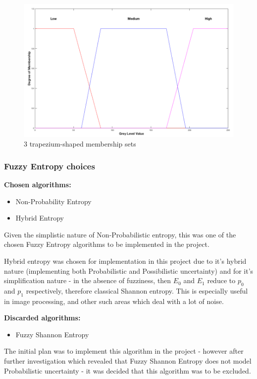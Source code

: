\begin{figure}[H]
  \center
  \includegraphics[scale=0.4]{Chapter2/hybrid-img/3_traps.png}
  \caption{3 trapezium-shaped membership sets}
  \label{fig:3-trapeziums}
\end{figure}

\subsubsection{Fuzzy Entropy choices}

\textbf{Chosen algorithms:}
\begin{itemize}
  \item Non-Probability Entropy
  \item Hybrid Entropy
\end{itemize}

Given the simplistic nature of Non-Probabilistic entropy, this was one of the chosen Fuzzy Entropy algorithms to be implemented in the project.

Hybrid entropy was chosen for implementation in this project due to it's hybrid nature (implementing both Probabilistic and Possibilistic uncertainty) and for it's simplification nature - in the absence of fuzziness, then $E_0$ and $E_1$ reduce to $p_0$ and $p_1$ respectively, therefore classical Shannon entropy. This is especially useful in image processing, and other such areas which deal with a lot of noise.

\textbf{Discarded algorithms:}
\begin{itemize}
  \item Fuzzy Shannon Entropy
\end{itemize}

The initial plan was to implement this algorithm in the project - however after further investigation which revealed that Fuzzy Shannon Entropy does not model Probabilistic uncertainty - it was decided that this algorithm was to be excluded.

